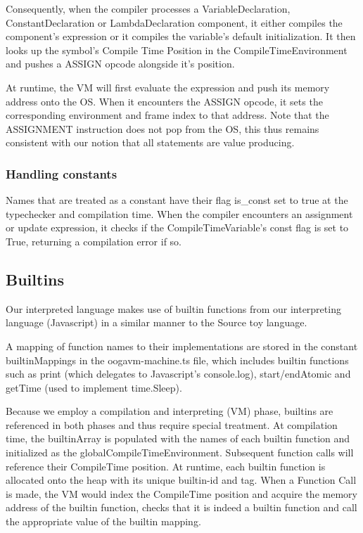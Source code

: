 \documentclass{report}
\begin{document}
Consequently, when the compiler processes a VariableDeclaration, ConstantDeclaration or LambdaDeclaration component, it either compiles the component's expression or it compiles the variable's default initialization. It then looks up the symbol's Compile Time Position in the CompileTimeEnvironment and pushes a ASSIGN opcode alongside it's position.

At runtime, the VM will first evaluate the expression and push its memory address onto the OS. When it encounters the ASSIGN opcode, it sets the corresponding environment and frame index to that address. Note that the ASSIGNMENT instruction does not pop from the OS, this thus remains consistent with our notion that all statements are value producing.

\subsubsection{Handling constants}

Names that are treated as a constant have their flag is\_const set to true at the typechecker and compilation time. When the compiler encounters an assignment or update expression, it checks if the CompileTimeVariable's const flag is set to True, returning a compilation error if so.

\subsection{Builtins}

Our interpreted language makes use of builtin functions from our interpreting language (Javascript) in a similar manner to the Source toy language.

A mapping of function names to their implementations are stored in the constant builtinMappings in the oogavm-machine.ts file, which includes builtin functions such as print (which delegates to Javascript's console.log), start/endAtomic and getTime (used to implement time.Sleep).

Because we employ a compilation and interpreting (VM) phase, builtins are referenced in both phases and thus require special treatment. At compilation time, the builtinArray is populated with the names of each builtin function and initialized as the globalCompileTimeEnvironment. Subsequent function calls will reference their CompileTime position. At runtime, each builtin function is allocated onto the heap with its unique builtin-id and tag. When a Function Call is made, the VM would index the CompileTime position and acquire the memory address of the builtin function, checks that it is indeed a builtin function and call the appropriate value of the builtin mapping.
\end{document}
